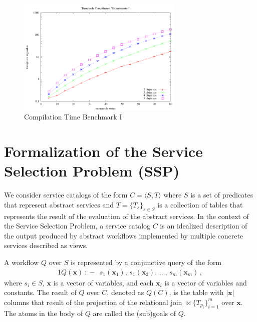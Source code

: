 \documentclass{llncs}
\newcommand{\tup}[1]{\langle #1 \rangle}
\newcommand{\vvec}[1]{\mathbf{#1}}
\newcommand{\join}{\bowtie}
\newcommand{\qrule}{:\!\!-}
\begin{document}
\begin{figure}
\centering
\includegraphics[width=8cm]{plot1.pdf}
\caption{Compilation Time Benchmark I}
\label{fig:plot1}
\end{figure}


\section{Formalization of the Service Selection Problem (SSP)}
We consider service catalogs of the form $C=\tup{S,T}$ where
$S$ is a set of predicates that represent abstract services and $T=\{T_s\}_{s\in S}$ is a collection
of tables that represents the result of the evaluation of the abstract services. In the context of the Service Selection Problem, 
a service catalog $C$ is an idealized description of 
the output produced by abstract workflows  implemented by multiple concrete services described
as views.

A workflow  $Q$ over $S$ is represented by a conjunctive query of the form 
\begin{alignat*}{1}
Q(\vvec{x})\ \qrule\ \  s_1(\vvec{x}_1),\, s_1(\vvec{x}_2),\, \ldots,\, s_m(\vvec{x}_m)\,,
\end{alignat*}
where $s_i\in S$, $\vvec{x}$ is a vector of variables, and each
$\vvec{x}_i$ is a vector of variables and constants.
The result of $Q$ over $C$, denoted as $Q(C)$, is the table with
$|\vvec{x}|$ columns that result of the projection of the relational
join $\join\!\!\{T_{p_i}\}_{i=1}^m$ over $\vvec{x}$.
The atoms in the body of $Q$ are called the (sub)goals of $Q$.
\end{document}
